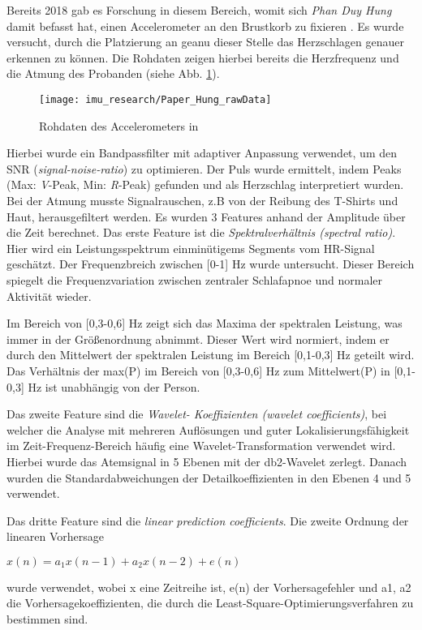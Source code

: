 Bereits 2018 gab es Forschung in diesem Bereich, womit sich \textit{Phan Duy Hung} damit befasst hat, einen Accelerometer an den Brustkorb zu fixieren \cite{hung_central_2018}.
Es wurde versucht, durch die Platzierung an geanu dieser Stelle das Herzschlagen genauer erkennen zu können. 
Die Rohdaten zeigen hierbei bereits die Herzfrequenz und die Atmung des Probanden (siehe Abb. \ref{imu_research_hung_rawData}).

\begin{figure}[ht]
    \centering
    \texttt{[image: imu\_research/Paper\_Hung\_rawData]}
    \caption{Rohdaten des Accelerometers in \cite{hung_central_2018}}
    \label{imu_research_hung_rawData}
\end{figure}

Hierbei wurde ein Bandpassfilter mit adaptiver Anpassung verwendet, um den SNR (\textit{signal-noise-ratio}) zu optimieren.
Der Puls wurde ermittelt, indem Peaks (Max: \textit{V}-Peak, Min: \textit{R}-Peak) gefunden und als Herzschlag interpretiert wurden.
Bei der Atmung musste Signalrauschen, z.B von der Reibung des T-Shirts und Haut, herausgefiltert werden. 
Es wurden 3 Features anhand der Amplitude über die Zeit berechnet. 
Das erste Feature ist die \textit{Spektralverhältnis (spectral ratio)}. 
Hier wird ein Leistungsspektrum einminütigems Segments vom HR-Signal geschätzt. 
Der Frequenzbreich zwischen [0-1] $\si{\hertz}$ wurde untersucht. 
Dieser Bereich spiegelt die Frequenzvariation zwischen zentraler Schlafapnoe und normaler Aktivität wieder.

Im Bereich von [0,3-0,6] Hz zeigt sich das Maxima der spektralen Leistung, was immer in der Größenordnung abnimmt. 
Dieser Wert wird normiert, indem er durch den Mittelwert der spektralen Leistung im Bereich [0,1-0,3] Hz geteilt wird. 
Das Verhältnis der max(P) im Bereich von [0,3-0,6] Hz zum Mittelwert(P) in [0,1-0,3] Hz ist unabhängig von der Person.

Das zweite Feature sind die \textit{Wavelet- Koeffizienten (wavelet coefficients)}, bei welcher die Analyse mit mehreren Auflösungen und guter Lokalisierungsfähigkeit im Zeit-Frequenz-Bereich häufig eine Wavelet-Transformation verwendet wird. 
Hierbei wurde das Atemsignal in 5 Ebenen mit der db2-Wavelet zerlegt. Danach wurden die Standardabweichungen der Detailkoeffizienten in den Ebenen 4 und 5 verwendet. 

Das dritte Feature sind die \textit{linear prediction coefficients}. 
Die zweite Ordnung der linearen Vorhersage
\begin{center}
    $x(n) = a_1 x(n-1) + a_2 x(n-2) + e(n)$
\end{center} 
wurde verwendet, wobei x eine Zeitreihe ist, e(n) der Vorhersagefehler und {a1, a2} die Vorhersagekoeffizienten, die durch die Least-Square-Optimierungsverfahren zu bestimmen sind.

